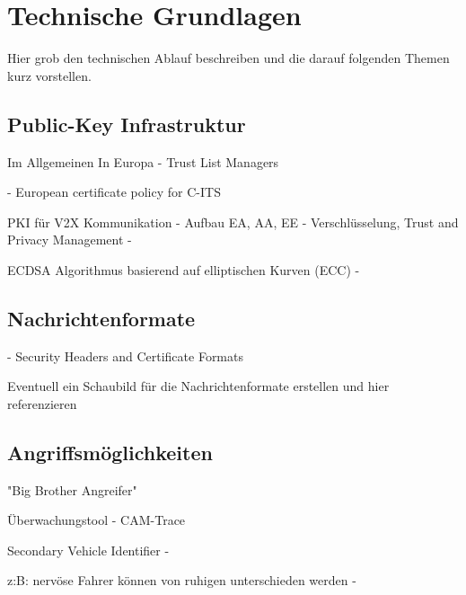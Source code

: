 
\section{Technische Grundlagen}
\label{ch:FirstContentSection}


Hier grob den technischen Ablauf beschreiben und die darauf folgenden Themen kurz vorstellen.

\subsection{Public-Key Infrastruktur}
\label{sec:FirstContentSection:FirstSubSection}
Im Allgemeinen
In Europa - Trust List Managers

\cite{SecurityCITS} - European certificate policy for C-ITS

PKI für V2X Kommunikation - Aufbau EA, AA, EE - \cite{Strubbe2017}
Verschlüsselung, Trust and Privacy Management - \cite{ETSI2018}

ECDSA Algorithmus basierend auf elliptischen Kurven (ECC) - \cite{Barker2013}

\subsection{Nachrichtenformate}
\label{sec:FirstContentSection:SecondSubSection}

\cite{ETSI2013} - Security Headers and Certificate Formats

Eventuell ein Schaubild für die Nachrichtenformate erstellen und hier referenzieren

\subsection{Angriffsmöglichkeiten}
\label{sec:FirstContentSection:ThirdSubSection}

"Big Brother Angreifer" \cite{Wiedersheim2010}

Überwachungstool - CAM-Trace

Secondary Vehicle Identifier - \cite{Ullmann2016}

z:B: nervöse Fahrer können von ruhigen unterschieden werden - \cite{Dettki2005}

